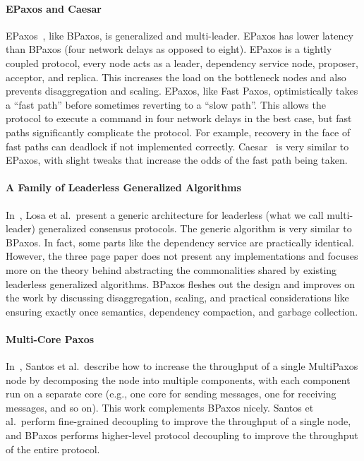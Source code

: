 \paragraph{EPaxos and Caesar}
EPaxos~\cite{moraru2013there, moraru2013proof}, like BPaxos, is generalized and
multi-leader. EPaxos has lower latency than BPaxos (four network delays as
opposed to eight). EPaxos is a tightly coupled protocol, every node acts as a
leader, dependency service node, proposer, acceptor, and replica. This
increases the load on the bottleneck nodes and also prevents disaggregation and
scaling. EPaxos, like Fast Paxos, optimistically takes a ``fast path'' before
sometimes reverting to a ``slow path''. This allows the protocol to execute a
command in four network delays in the best case, but fast paths significantly
complicate the protocol. For example, recovery in the face of fast paths can
deadlock if not implemented correctly. Caesar~\cite{arun2017speeding} is very
similar to EPaxos, with slight tweaks that increase the odds of the fast path
being taken.

\paragraph{A Family of Leaderless Generalized Algorithms}
In~\cite{losa2016brief}, Losa et al.\ present a generic architecture for
leaderless (what we call multi-leader) generalized consensus protocols. The
generic algorithm is very similar to BPaxos. In fact, some parts like the
dependency service are practically identical. However, the three page paper
does not present any implementations and focuses more on the theory behind
abstracting the commonalities shared by existing leaderless generalized
algorithms. BPaxos fleshes out the design and improves on the work by
discussing disaggregation, scaling, and practical considerations like ensuring
exactly once semantics, dependency compaction, and garbage collection.

\paragraph{Multi-Core Paxos}
In~\cite{santos2013achieving}, Santos et al.\ describe how to increase the
throughput of a single MultiPaxos node by decomposing the node into multiple
components, with each component run on a separate core (e.g., one core for
sending messages, one for receiving messages, and so on). This work complements
BPaxos nicely. Santos et al.\ perform fine-grained decoupling to improve the
throughput of a single node, and BPaxos performs higher-level protocol
decoupling to improve the throughput of the entire protocol.

